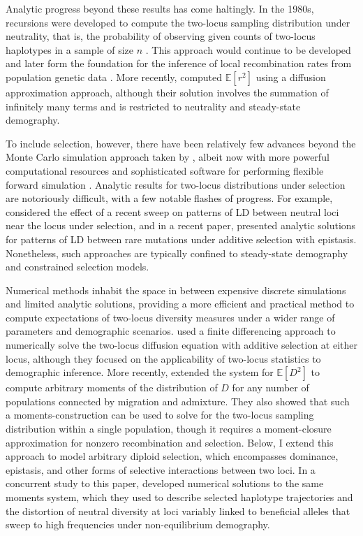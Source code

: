 \documentclass[]{article}
\newcommand{\E}{\mathbb{E}}
\begin{document}
Analytic progress beyond these results has come haltingly. In the 1980s,
recursions were developed to compute the two-locus sampling distribution under
neutrality, that is, the probability of observing given counts of two-locus
haplotypes in a sample of size \(n\) \citep{Golding1984-pu}. This approach
would continue to be developed and later form the foundation for the inference
of local recombination rates from population genetic data
\citep{Hudson2001-sg,McVean2004-gj}. More recently, \citet{Song2007-qk}
computed \(\E[r^2]\) using a diffusion approximation approach, although their
solution involves the summation of infinitely many terms and is restricted to
neutrality and steady-state demography.

To include selection, however, there have been relatively few advances beyond
the Monte Carlo simulation approach taken by \citet{Hill1966-gv}, albeit now
with more powerful computational resources and sophisticated software for
performing flexible forward simulation
\citep[e.g.,][]{Thornton2019-qc,Haller2019-vm}. Analytic results for two-locus
distributions under selection are notoriously difficult, with a few notable
flashes of progress. For example, \citet{McVean2007-xd} considered the effect
of a recent sweep on patterns of LD between neutral loci near the locus under
selection, and in a recent paper, \citet{Good2022-ot} presented analytic
solutions for patterns of LD between rare mutations under additive selection
with epistasis. Nonetheless, such approaches are typically confined to
steady-state demography and constrained selection models.

Numerical methods inhabit the space in between expensive discrete simulations
and limited analytic solutions, providing a more efficient and practical method
to compute expectations of two-locus diversity measures under a wider range of
parameters and demographic scenarios. \citet{Ragsdale2017-gg} used a finite
differencing approach to numerically solve the two-locus diffusion equation
with additive selection at either locus, although they focused on the
applicability of two-locus statistics to demographic inference. More recently,
\citet{Ragsdale2019-nt} extended the \citet{Hill1968-vu} system for \(\E[D^2]\)
to compute arbitrary moments of the distribution of \(D\) for any number of
populations connected by migration and admixture. They also showed that such a
moments-construction can be used to solve for the two-locus sampling
distribution within a single population, though it requires a moment-closure
approximation for nonzero recombination and selection. Below, I extend this
approach to model arbitrary diploid selection, which encompasses dominance,
epistasis, and other forms of selective interactions between two loci. In a
concurrent study to this paper, \citet{Friedlander2022-bs} developed numerical
solutions to the same moments system, which they used to describe selected
haplotype trajectories and the distortion of neutral diversity at loci variably
linked to beneficial alleles that sweep to high frequencies under
non-equilibrium demography.
\end{document}
